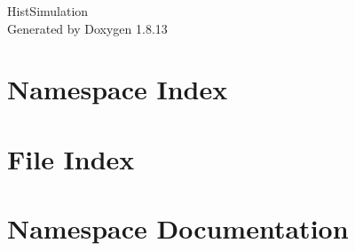 \documentclass[twoside]{book}
\newcommand{\+}{\discretionary{\mbox{\scriptsize$\hookleftarrow$}}{}{}}
\newcommand{\clearemptydoublepage}{%
  \newpage{\pagestyle{empty}\cleardoublepage}%
}
\begin{document}
\hypersetup{pageanchor=false,
             bookmarksnumbered=true,
             pdfencoding=unicode
            }
\begin{titlepage}
\vspace*{7cm}
\begin{center}%
{\Large Hist\+Simulation }\\
\vspace*{1cm}
{\large Generated by Doxygen 1.8.13}\\
\end{center}
\end{titlepage}
\clearemptydoublepage
{}
\tableofcontents
\clearemptydoublepage
{}
\hypersetup{pageanchor=true}

\chapter{Namespace Index}

\chapter{File Index}

\chapter{Namespace Documentation}

\end{document}
